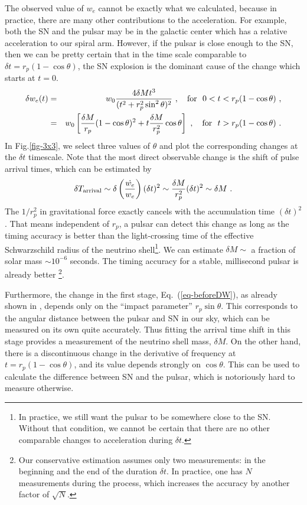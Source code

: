 \documentclass[aps,showpacs,onecolumn,floats,prd,superscriptaddress,nofootinbib]{revtex4}
\begin{document}
The observed value of $w_e$ cannot be exactly what we calculated, because in practice, there are many other contributions to the acceleration. For example, both the SN and the pulsar may be in the galactic center which has a relative acceleration to our spiral arm. However, if the pulsar is close enough to the SN, then we can be pretty certain that in the time scale comparable to $\delta t = r_p(1-\cos\theta)$, the SN explosion is the dominant cause of the change which starts at $t=0$. 
\begin{eqnarray}
\delta w_e(t) &=& w_0 
\frac{4\delta M t^3}{(t^2 + r_p^2\sin^2\theta)^2} ~, 
\ \ \ {\rm for} \ \ 0 < t <  r_p(1 - \cos\theta)~, \label{eq-beforeDW} \\
&=& w_0 
\left[ \frac{\delta M}{r_p}(1-\cos\theta)^2 +  t \frac{\delta M}{r_p^2}\cos\theta \right]~,
\ \ \ {\rm for} \ \ t > r_p(1-\cos\theta)~.
\end{eqnarray}
In Fig.\ref{fig-3x3}, we select three values of $\theta$ and plot the corresponding changes at the $\delta t$ timescale. Note that the most direct observable change is the shift of pulse arrival times, which can be estimated by
\begin{equation}
\delta T_{\rm arrival} \sim \delta\left(\frac{\dot{w_e}}{w_e}\right)(\delta t)^2
\sim \frac{\delta M}{r_p^2} (\delta t)^2 \sim \delta M~.
\end{equation}
The $1/r_p^2$ in gravitational force exactly cancels with the accumulation time $(\delta t)^2$. That means independent of $r_p$, a pulsar can detect this change as long as the timing accuracy is better than the light-crossing time of the effective Schwarzschild radius of the neutrino shell\footnote{In practice, we still want the pulsar to be somewhere close to the SN. Without that condition, we cannot be certain that there are no other comparable changes to acceleration during $\delta t$.}. We can estimate $\delta M\sim$ a fraction of solar mass $\sim10^{-6}$ seconds. The timing accuracy for a stable, millisecond pulsar is already better \cite{PulsarTiming}\footnote{Our conservative estimation assumes only two measurements: in the beginning and the end of the duration $\delta t$. In practice, one has $N$ measurements during the process, which increases the accuracy by another factor of $\sqrt{N}$.}.

Furthermore, the change in the first stage, Eq.~(\ref{eq-beforeDW}), as already shown in \cite{OluPie13}, depends only on the ``impact parameter'' $r_p\sin\theta$. This corresponds to the angular distance between the pulsar and SN in our sky, which can be measured on its own quite accurately. Thus fitting the arrival time shift in this stage provides a measurement of the neutrino shell mass, $\delta M$. On the other hand, there is a discontinuous change in the derivative of frequency at $t=r_p(1-\cos\theta)$, and its value depends strongly on $\cos\theta$. This can be used to calculate the difference between SN and the pulsar, which is notoriously hard to measure otherwise.
\end{document}
